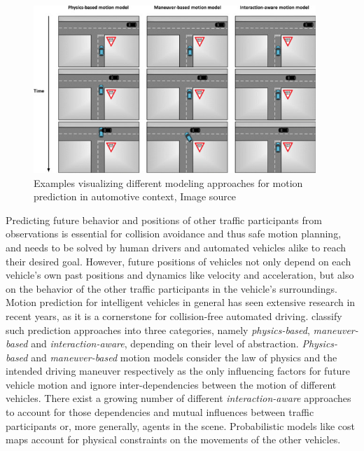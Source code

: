 \begin{figure}[t!]
	\centering
	\includegraphics[width=0.95\textwidth]{imgs/examples_motion_prediction_models.jpg}
	\caption{Examples visualizing different modeling approaches for motion prediction in automotive context, Image source \cite{Lefevre2014}}
	\label{fig:examples_motion_prediction_types}
\end{figure}
Predicting future behavior and positions of other traffic participants from observations is essential for collision avoidance and thus safe motion planning, and needs to be solved by human drivers and automated vehicles alike to reach their desired goal.
However, future positions of vehicles not only depend on each vehicle's own past positions and dynamics like  velocity and acceleration, but also on the behavior of the other traffic participants in the vehicle's surroundings.
Motion prediction for intelligent vehicles in general has seen extensive research in recent years, as it is a cornerstone for collision-free automated driving. \cite{Lefevre2014} classify such prediction approaches into three categories, namely \emph{physics-based}, \emph{maneuver-based} and \emph{interaction-aware}, depending on their level of abstraction.
\emph{Physics-based} and \emph{maneuver-based} motion models consider the law of physics and the intended driving maneuver respectively as the only influencing factors for future vehicle motion and ignore inter-dependencies between the motion of different vehicles.
There exist a growing number of different \emph{interaction-aware} approaches to account for those dependencies and mutual influences between traffic participants or, more generally, agents in the scene.
Probabilistic models like cost maps \cite{Bahram2016} account for physical constraints on the movements of the other vehicles.
